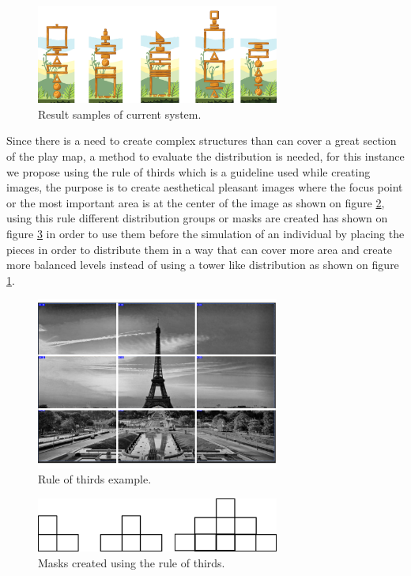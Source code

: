 \documentclass[conference]{IEEEtran}
\begin{document}
    \begin{figure}[htbp]
    \centerline{\includegraphics[width=80mm]{Images/result_example.png}}
    \caption{Result samples of current system.}
    \label{results_old}
    \end{figure}
    
    Since there is a need to create complex structures than can cover a great
    section of the play map, a method to evaluate the distribution is needed, for
    this instance we propose using the rule of thirds \cite{DarrenRowse} which is a
    guideline used while creating images, the purpose is to create
    aesthetical pleasant images where the focus point or the most important area is
    at the center of the image as shown on figure \ref{rule_of_thirds}, using this
    rule different distribution groups or masks are created has shown on figure
    \ref{rule_of_thirds_masks} in order to use them before the simulation of an
    individual by placing the pieces in order to distribute them in a way that can cover
    more area and create more balanced levels instead of using a tower like
    distribution as shown on figure \ref{results_old}.
    
    \begin{figure}[htbp]
        \centerline{\includegraphics[width=80mm]{Images/ruleofthirds_example.png}}
        \caption{Rule of thirds example.}
        \label{rule_of_thirds}
    \end{figure}
    
    \begin{figure}[htbp]
        \centerline{\includegraphics[width=80mm]{Images/mask_distribution.png}}
        \caption{Masks created using the rule of thirds.}
        \label{rule_of_thirds_masks}
    \end{figure}
    
\end{document}
